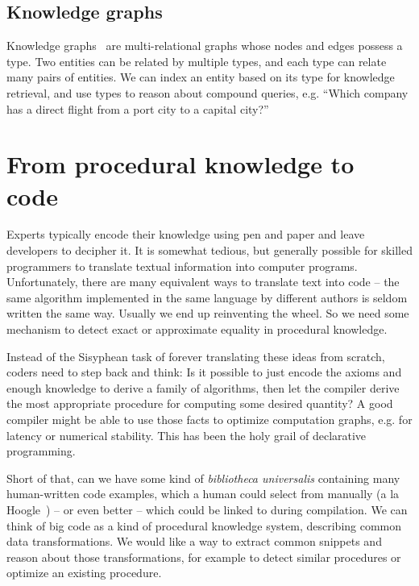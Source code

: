 \documentclass[11pt]{article}
\begin{document}
    \subsection{Knowledge graphs}

    Knowledge graphs~\citep{hogan2020knowledge} are multi-relational graphs whose nodes and edges possess a type. Two entities can be related by multiple types, and each type can relate many pairs of entities. We can index an entity based on its type for knowledge retrieval, and use types to reason about compound queries, e.g. ``Which company has a direct flight from a port city to a capital city?''

%

    \pagebreak


    \section{From procedural knowledge to code}\label{sec:applications}

    Experts typically encode their knowledge using pen and paper and leave developers to decipher it. It is somewhat tedious, but generally possible for skilled programmers to translate textual information into computer programs. Unfortunately, there are many equivalent ways to translate text into code -- the same algorithm implemented in the same language by different authors is seldom written the same way. Usually we end up reinventing the wheel. So we need some mechanism to detect exact or approximate equality in procedural knowledge.

    Instead of the Sisyphean task of forever translating these ideas from scratch, coders need to step back and think: Is it possible to just encode the axioms and enough knowledge to derive a family of algorithms, then let the compiler derive the most appropriate procedure for computing some desired quantity? A good compiler might be able to use those facts to optimize computation graphs, e.g. for latency or numerical stability. This has been the holy grail of declarative programming.

    Short of that, can we have some kind of \textit{bibliotheca universalis} containing many human-written code examples, which a human could select from manually (a la Hoogle~\citep{james2020digging}) -- or even better -- which could be linked to during compilation. We can think of big code as a kind of procedural knowledge system, describing common data transformations. We would like a way to extract common snippets and reason about those transformations, for example to detect similar procedures or optimize an existing procedure.
\end{document}
